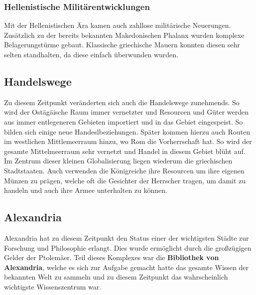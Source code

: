\documentclass{article}
\begin{document}
	\subsubsection{Hellenistische Militärentwicklungen}
	Mit der Hellenistischen Ära kamen auch zahllose militärische Neuerungen. Zusätzlich zu der bereits bekannten Makedonischen Phalanx wurden komplexe Belagerungstürme gebaut. Klassische griechische Mauern konnten diesen sehr selten standhalten, da diese einfach überwunden wurden.
	\subsection{Handelswege}
	Zu diesem Zeitpunkt veränderten sich auch die Handelswege zunehmends. So wird der Ostägäische Raum immer vernetzter und Resourcen und Güter werden aus immer entlegeneren Gebieten importiert und in das Gebiet eingespeist. So bilden sich einige neue Handeslbeziehungen. Später kommen hierzu auch Routen im westlichen Mittlemeerraum hinzu, wo Rom die Vorherrschaft hat. So wird der gesamte Mittelmeerraum sehr vernetzt und Handel in diesem Gebiet blüht auf. Im Zentrum dieser kleinen Globalisierung liegen wiederum die griechischen Stadtstaaten.
	Auch verwenden die Königreiche ihre Resourcen um ihre eigenen Münzen zu prägen, welche oft die Gesichter der Herrscher tragen, um damit zu handeln und auch ihre Armee unterhalten zu können. \\
	\subsection{Alexandria}
	Alexandria hat zu diesem Zeitpunkt den Status einer der wichtigsten Städte zur Forschung und Philosophie erlangt. Dies wurde ermöglicht durch die großzügigen Gelder der Ptolemäer. Teil dieses Komplexes war die \textbf{Bibliothek von Alexandria}, welche es sich zur Aufgabe gemacht hatte das gesamte Wissen der bekannten Welt zu sammeln und zu diesem Zeitpunkt das wahrscheinlich wichtigste Wissenszentrum war. \\
\end{document}
